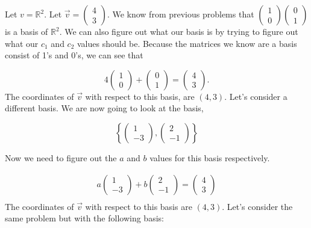   \begin{problem}
    Let $v=\mathbb{R}^2$. Let $\vec{v}=\left(\begin{smallmatrix}4\\3\end{smallmatrix}\right)$. We know from previous problems that $\left(\begin{smallmatrix}1\\0\end{smallmatrix}\right)\left(\begin{smallmatrix}0\\1\end{smallmatrix}\right)$ is a basis of $\mathbb{R}^2$. We can also figure out what our basis is by trying to figure out what our $c_1$ and $c_2$ values should be. Because the matrices we know are a basis consist of 1's and 0's, we can see that 

    \[
      4
      \begin{pmatrix}
        1\\0
      \end{pmatrix}
      +
      \begin{pmatrix}
        0\\1
      \end{pmatrix}
      =
      \begin{pmatrix}
        4\\3
      \end{pmatrix}.
    \]
    The coordinates of $\vec{v}$ with respect to this basis, are $(4,3)$. Let's consider a different basis. We are now going to look at the basis,

    \[
      \left\{
        \begin{pmatrix}
          1\\-3
        \end{pmatrix},
        \begin{pmatrix}
          2\\-1
        \end{pmatrix}
      \right\}
    \]

    Now we need to figure out the $a$ and $b$ values for this basis respectively.

    \begin{align*}
      a
      \begin{pmatrix}
        1\\-3 
      \end{pmatrix}
      + b
      \begin{pmatrix}
        2\\-1
      \end{pmatrix}
      =
      \begin{pmatrix}
        4\\3
      \end{pmatrix}
      \\
    \end{align*}
    The coordinates of $\vec{v}$ with respect to this basis are $(4,3)$. Let's consider the same problem but with the following basis:


\end{problem}
